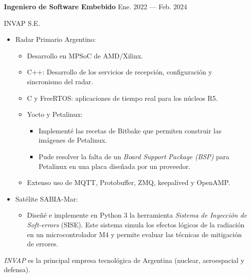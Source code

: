 \parbox[t][][t]{\linewidth}{
	\parbox{\linewidth}{
		\textbf{Ingeniero de Software Embebido}
			\hfill
			{Ene. 2022 --- Feb. 2024}
		}
	\smallbreak
	\parbox{\linewidth}{INVAP S.E.}
	\smallbreak
	\begin{itemize}
		\item Radar Primario Argentino:
		\begin{itemize}
	    	\item{Desarrollo en MPSoC de AMD/Xilinx.}
			\item{C++: Desarrollo de los servicios de recepción, configuración y sincronismo del radar.}
			\item{C y FreeRTOS: aplicaciones de tiempo real para los núcleos R5.}
			\item{Yocto y Petalinux:}
			\begin{itemize}
				\item{Implementé las recetas de Bitbake que permiten construir las imágenes de Petalinux.}
				\item{Pude resolver la falta de un \emph{Board Support Package (BSP)} para Petalinux en una placa diseñada por un proveedor.}
			\end{itemize}
			\item{Extenso uso de MQTT, Protobuffer, ZMQ, keepalived y OpenAMP.}
		\end{itemize}
		\item Satélite SABIA-Mar:
		\begin{itemize}
	    	\item{Diseñé e implemente en Python 3 la herramienta \emph{Sistema de Inyección de Soft-errors} (SISE). Este sistema simula los efectos lógicos de la radiación en un microcontrolador M4 y permite evaluar las técnicas de mitigación de errores.}
		\end{itemize}
	\end{itemize}
	\smallbreak
    \emph{INVAP} es la principal empresa tecnológica de Argentina (nuclear, aeroespacial y defensa).
}


